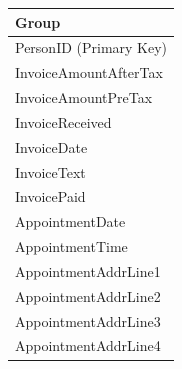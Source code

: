 \begin{flushleft}
\begin{longtable}{|p{12cm}|}
			\textbf{Group} \\ \hline
			PersonID (Primary Key) \\
			InvoiceAmountAfterTax \\
			InvoiceAmountPreTax \\
			InvoiceReceived \\
			InvoiceDate \\
			InvoiceText \\
			InvoicePaid \\
			AppointmentDate \\
			AppointmentTime \\
			AppointmentAddrLine1 \\
			AppointmentAddrLine2 \\
			AppointmentAddrLine3	\\
			AppointmentAddrLine4 \\ \hline


    \end{longtable}
\end{flushleft}
